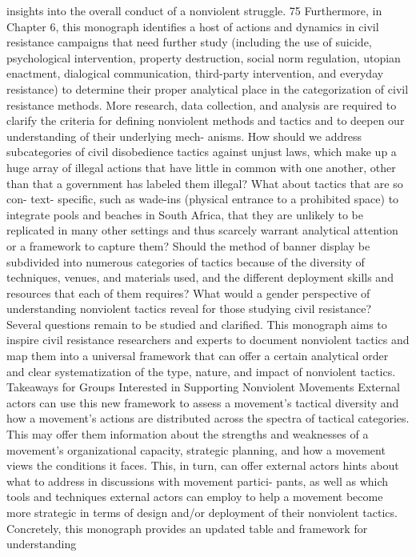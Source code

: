 \documentclass[twoside,a4paper,12pt,fleqn,openany]{extbook}
\begin{document}
insights into the overall conduct of a nonviolent struggle.
75
Furthermore, in Chapter 6, this monograph identifies a host of actions and dynamics in
civil resistance campaigns that need further study (including the use of suicide, psychological
intervention, property destruction, social norm regulation, utopian enactment, dialogical
communication, third-party intervention, and everyday resistance) to determine their proper
analytical place in the categorization of civil resistance methods.
More research, data collection, and analysis are required to clarify the criteria for defining
nonviolent methods and tactics and to deepen our understanding of their underlying mech-
anisms. How should we address subcategories of civil disobedience tactics against unjust
laws, which make up a huge array of illegal actions that have little in common with one another,
other than that a government has labeled them illegal? What about tactics that are so con-
text- specific, such as wade-ins (physical entrance to a prohibited space) to integrate pools
and beaches in South Africa, that they are unlikely to be replicated in many other settings
and thus scarcely warrant analytical attention or a framework to capture them? Should the
method of banner display be subdivided into numerous categories of tactics because of the
diversity of techniques, venues, and materials used, and the different deployment skills and
resources that each of them requires? What would a gender perspective of understanding
nonviolent tactics reveal for those studying civil resistance? Several questions remain to be
studied and clarified.
This monograph aims to inspire civil resistance researchers and experts to document
nonviolent tactics and map them into a universal framework that can offer a certain analytical
order and clear systematization of the type, nature, and impact of nonviolent tactics.
Takeaways for Groups Interested in Supporting Nonviolent Movements
External actors can use this new framework to assess a movement’s tactical diversity and
how a movement’s actions are distributed across the spectra of tactical categories. This may
offer them information about the strengths and weaknesses of a movement’s organizational
capacity, strategic planning, and how a movement views the conditions it faces. This, in turn,
can offer external actors hints about what to address in discussions with movement partici-
pants, as well as which tools and techniques external actors can employ to help a movement
become more strategic in terms of design and/or deployment of their nonviolent tactics.
Concretely, this monograph provides an updated table and framework for understanding
\end{document}
